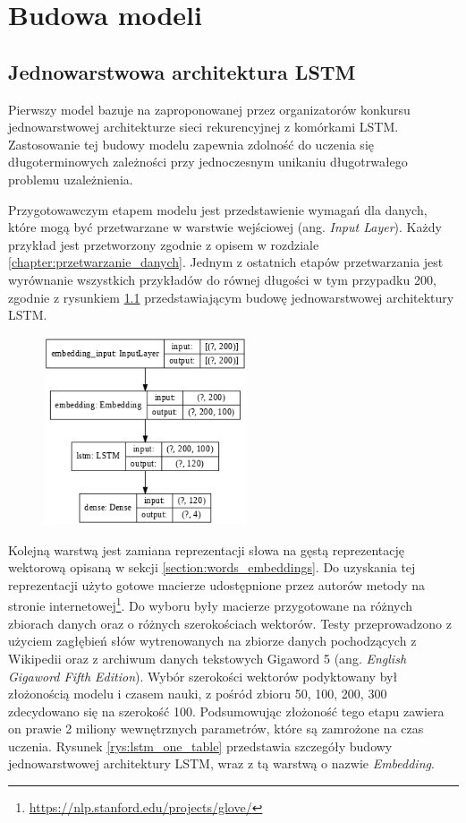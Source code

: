\chapter{Budowa modeli}

\section{Jednowarstwowa architektura LSTM}
\label{section:one_lstm}

Pierwszy model bazuje na zaproponowanej przez organizatorów konkursu jednowarstwowej architekturze sieci rekurencyjnej z komórkami LSTM. Zastosowanie tej budowy modelu zapewnia zdolność do uczenia się długoterminowych zależności przy jednoczesnym unikaniu długotrwałego problemu uzależnienia. 

Przygotowawczym etapem modelu jest przedstawienie wymagań dla danych, które mogą być przetwarzane w warstwie wejściowej (ang. \textit{Input Layer}). Każdy przykład jest przetworzony zgodnie z opisem w rozdziale \ref{chapter:przetwarzanie_danych}. Jednym z ostatnich etapów przetwarzania jest wyrównanie wszystkich przykładów do równej długości w tym przypadku 200, zgodnie z rysunkiem \ref{rys:lstm_one_graph} przedstawiającym budowę jednowarstwowej architektury LSTM.

\begin{figure}[t]
\centering\includegraphics[width=6cm]{figures/reports/lstm_one_graph.png}
\label{rys:lstm_one_graph}
\end{figure}

Kolejną warstwą jest zamiana reprezentacji słowa na gęstą reprezentację wektorową opisaną w sekcji \ref{section:words_embeddings}. Do uzyskania tej reprezentacji użyto gotowe macierze udostępnione przez autorów metody na stronie internetowej\footnote{\url{https://nlp.stanford.edu/projects/glove/}}. Do wyboru były macierze przygotowane na różnych zbiorach danych oraz o różnych szerokościach wektorów. Testy przeprowadzono z użyciem zagłębień słów wytrenowanych na zbiorze danych pochodzących z Wikipedii oraz z archiwum danych tekstowych Gigaword 5 (ang. \textit{English Gigaword Fifth Edition}). Wybór szerokości wektorów podyktowany był złożonością modelu i czasem nauki, z pośród zbioru 50, 100, 200, 300 zdecydowano się na szerokość 100. Podsumowując złożoność tego etapu zawiera on prawie 2 miliony wewnętrznych parametrów, które są zamrożone na czas uczenia. Rysunek \ref{rys:lstm_one_table} przedstawia szczegóły budowy jednowarstwowej architektury LSTM, wraz z tą warstwą o nazwie \textit{Embedding}.

